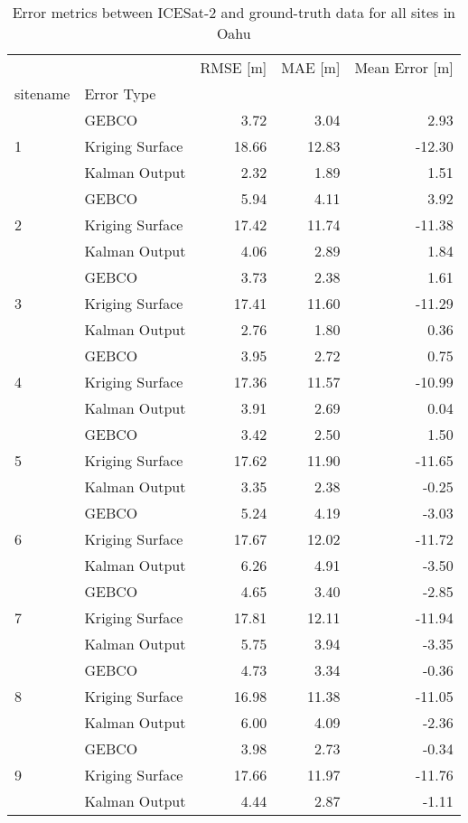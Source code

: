 \begin{table}[htbp]
\centering
\caption{Error metrics between ICESat-2 and ground-truth data for all sites in Oahu}
\label{tab:oahu_raster_error}
\begin{tabular}{llrrr}
\toprule
 &  & RMSE [m] & MAE [m] & Mean Error [m] \\
sitename & Error Type &  &  &  \\
\midrule
\multirow[c]{3}{*}{1} & GEBCO & 3.72 & 3.04 & 2.93 \\
 & Kriging Surface & 18.66 & 12.83 & -12.30 \\
 & Kalman Output & 2.32 & 1.89 & 1.51 \\
\cline{1-2}
\multirow[c]{3}{*}{2} & GEBCO & 5.94 & 4.11 & 3.92 \\
 & Kriging Surface & 17.42 & 11.74 & -11.38 \\
 & Kalman Output & 4.06 & 2.89 & 1.84 \\
\cline{1-2}
\multirow[c]{3}{*}{3} & GEBCO & 3.73 & 2.38 & 1.61 \\
 & Kriging Surface & 17.41 & 11.60 & -11.29 \\
 & Kalman Output & 2.76 & 1.80 & 0.36 \\
\cline{1-2}
\multirow[c]{3}{*}{4} & GEBCO & 3.95 & 2.72 & 0.75 \\
 & Kriging Surface & 17.36 & 11.57 & -10.99 \\
 & Kalman Output & 3.91 & 2.69 & 0.04 \\
\cline{1-2}
\multirow[c]{3}{*}{5} & GEBCO & 3.42 & 2.50 & 1.50 \\
 & Kriging Surface & 17.62 & 11.90 & -11.65 \\
 & Kalman Output & 3.35 & 2.38 & -0.25 \\
\cline{1-2}
\multirow[c]{3}{*}{6} & GEBCO & 5.24 & 4.19 & -3.03 \\
 & Kriging Surface & 17.67 & 12.02 & -11.72 \\
 & Kalman Output & 6.26 & 4.91 & -3.50 \\
\cline{1-2}
\multirow[c]{3}{*}{7} & GEBCO & 4.65 & 3.40 & -2.85 \\
 & Kriging Surface & 17.81 & 12.11 & -11.94 \\
 & Kalman Output & 5.75 & 3.94 & -3.35 \\
\cline{1-2}
\multirow[c]{3}{*}{8} & GEBCO & 4.73 & 3.34 & -0.36 \\
 & Kriging Surface & 16.98 & 11.38 & -11.05 \\
 & Kalman Output & 6.00 & 4.09 & -2.36 \\
\cline{1-2}
\multirow[c]{3}{*}{9} & GEBCO & 3.98 & 2.73 & -0.34 \\
 & Kriging Surface & 17.66 & 11.97 & -11.76 \\
 & Kalman Output & 4.44 & 2.87 & -1.11 \\
\cline{1-2}
\bottomrule
\end{tabular}
\end{table}
